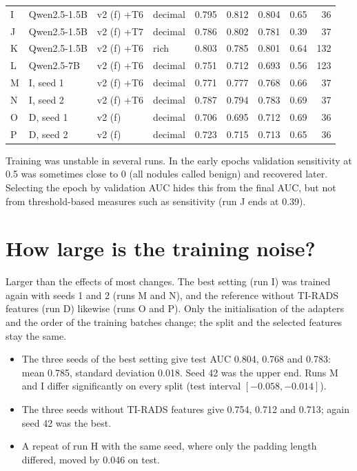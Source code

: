 \begin{table}[ht]
\begin{tabular}{llllrrrrr}
    I & Qwen2.5-1.5B & v2 (f) +T6    & decimal    & 0.795 & 0.812 & 0.804 & 0.65 & 36 \\
    J & Qwen2.5-1.5B & v2 (f) +T7    & decimal    & 0.786 & 0.802 & 0.781 & 0.39 & 37 \\
    K & Qwen2.5-1.5B & v2 (f) +T6    & rich       & 0.803 & 0.785 & 0.801 & 0.64 & 132 \\
    L & Qwen2.5-7B   & v2 (f) +T6    & decimal    & 0.751 & 0.712 & 0.693 & 0.56 & 123 \\
    \midrule
    M & I, seed 1    & v2 (f) +T6    & decimal    & 0.771 & 0.777 & 0.768 & 0.66 & 37 \\
    N & I, seed 2    & v2 (f) +T6    & decimal    & 0.787 & 0.794 & 0.783 & 0.69 & 37 \\
    O & D, seed 1    & v2 (f)        & decimal    & 0.706 & 0.695 & 0.712 & 0.69 & 36 \\
    P & D, seed 2    & v2 (f)        & decimal    & 0.723 & 0.715 & 0.713 & 0.65 & 36 \\
    \bottomrule
  \end{tabular}
\end{table}

Training was unstable in several runs. In the early epochs validation sensitivity at 0.5 was
sometimes close to 0 (all nodules called benign) and recovered later. Selecting the epoch by
validation AUC hides this from the final AUC, but not from threshold-based measures such as
sensitivity (run J ends at 0.39).

\section{How large is the training noise?}
\label{sec:results-seeds}

Larger than the effects of most changes. The best setting (run I) was trained again with seeds 1
and 2 (runs M and N), and the reference without TI-RADS features (run D) likewise (runs O and P).
Only the initialisation of the adapters and the order of the training batches change; the split
and the selected features stay the same.

\begin{itemize}
  \item The three seeds of the best setting give test AUC 0.804, 0.768 and 0.783: mean 0.785,
        standard deviation 0.018. Seed 42 was the upper end. Runs M and I differ significantly on
        every split (test interval $[-0.058, -0.014]$).
  \item The three seeds without TI-RADS features give 0.754, 0.712 and 0.713; again seed 42 was
        the best.
  \item A repeat of run H with the same seed, where only the padding length differed, moved by
        0.046 on test.
\end{itemize}

